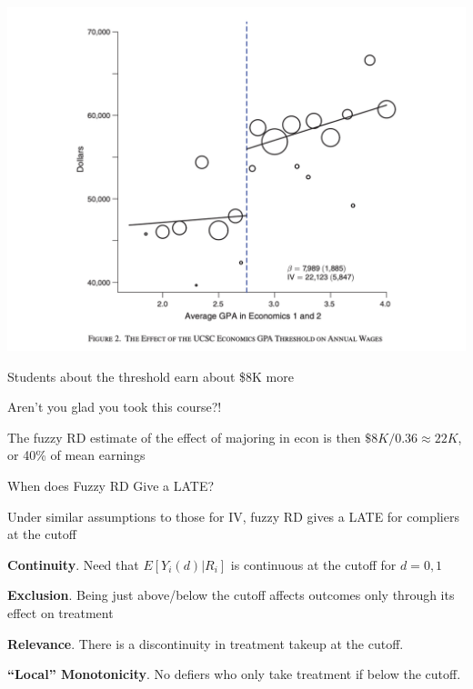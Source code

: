 \documentclass[11pt,english,handout]{beamer}
\newenvironment{wideitemize}{\itemize\addtolength{\itemsep}{10pt}}{\enditemize}
\begin{document}
\begin{frame}
	\centering
	\includegraphics[width= 0.7 \linewidth]{bleemer-rf}
	
	\begin{wideitemize}
		\item
		Students about the threshold earn about \$8K more
		
		\pause
		\item
		Aren't you glad you took this course?!
		
		\pause
		\item
		The fuzzy RD estimate of the effect of majoring in econ is then $\$8K / 0.36 \approx 22K$, or 40\% of mean earnings 
	\end{wideitemize}
\end{frame}	

\begin{frame}{When does Fuzzy RD Give a LATE?}
	\begin{wideitemize}
		\item
		Under similar assumptions to those for IV, fuzzy RD gives a LATE for compliers at the cutoff
		
		\pause
		\item
		\textbf{Continuity}. Need that $E[Y_i(d) | R_i]$ is continuous at the cutoff for $d=0,1$
		
		
		\item
		\textbf{Exclusion}. Being just above/below the cutoff affects outcomes only through its effect on treatment
		
		
		\item \textbf{Relevance}. There is a discontinuity in treatment takeup at the cutoff. 
		
		
		\item \textbf{``Local'' Monotonicity}. No defiers who only take treatment if below the cutoff.
	\end{wideitemize}
\end{frame}
\end{document}
